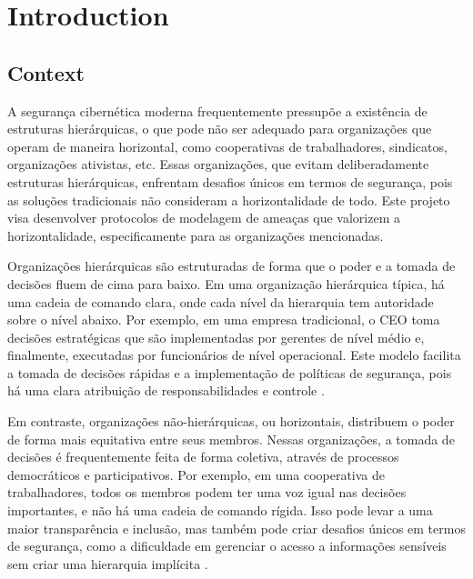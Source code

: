 
%

\chapter{Introduction}
\label{cha:introduction}


% 
% 

\section{Context}
\label{sec:context}

A segurança cibernética moderna frequentemente pressupõe a existência de estruturas hierárquicas,
o que pode não ser adequado para organizações que operam de maneira horizontal, como cooperativas
de trabalhadores, sindicatos, organizações ativistas, etc.
Essas organizações, que evitam deliberadamente estruturas hierárquicas, enfrentam desafios únicos
em termos de segurança, pois as soluções tradicionais não consideram a horizontalidade de todo.
Este projeto visa desenvolver protocolos de modelagem de ameaças que valorizem a horizontalidade,
especificamente para as organizações mencionadas.

Organizações hierárquicas são estruturadas de forma que o poder e a tomada de decisões fluem de
cima para baixo. Em uma organização hierárquica típica, há uma cadeia de comando clara, onde
cada nível da hierarquia tem autoridade sobre o nível abaixo. Por exemplo, em uma empresa
tradicional, o CEO toma decisões estratégicas que são implementadas por gerentes de nível médio
e, finalmente, executadas por funcionários de nível operacional. Este modelo facilita a tomada
de decisões rápidas e a implementação de políticas de segurança, pois há uma clara atribuição
de responsabilidades e controle \cite{Colbac}.

Em contraste, organizações não-hierárquicas, ou horizontais, distribuem o poder de forma mais
equitativa entre seus membros. Nessas organizações, a tomada de decisões é frequentemente feita
de forma coletiva, através de processos democráticos e participativos. Por exemplo, em uma
cooperativa de trabalhadores, todos os membros podem ter uma voz igual nas decisões importantes,
e não há uma cadeia de comando rígida. Isso pode levar a uma maior transparência e inclusão, mas
também pode criar desafios únicos em termos de segurança, como a dificuldade em gerenciar o acesso
a informações sensíveis sem criar uma hierarquia implícita \cite{Colbac}.

